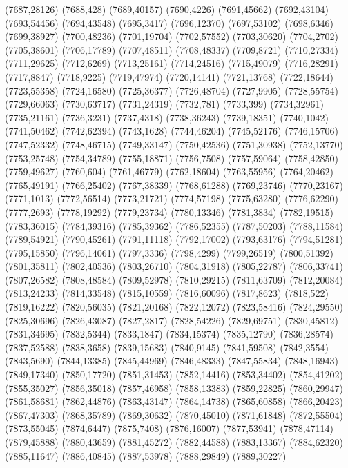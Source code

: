 (7687,28126)
(7688,428)
(7689,40157)
(7690,4226)
(7691,45662)
(7692,43104)
(7693,54456)
(7694,43548)
(7695,3417)
(7696,12370)
(7697,53102)
(7698,6346)
(7699,38927)
(7700,48236)
(7701,19704)
(7702,57552)
(7703,30620)
(7704,2702)
(7705,38601)
(7706,17789)
(7707,48511)
(7708,48337)
(7709,8721)
(7710,27334)
(7711,29625)
(7712,6269)
(7713,25161)
(7714,24516)
(7715,49079)
(7716,28291)
(7717,8847)
(7718,9225)
(7719,47974)
(7720,14141)
(7721,13768)
(7722,18644)
(7723,55358)
(7724,16580)
(7725,36377)
(7726,48704)
(7727,9905)
(7728,55754)
(7729,66063)
(7730,63717)
(7731,24319)
(7732,781)
(7733,399)
(7734,32961)
(7735,21161)
(7736,3231)
(7737,4318)
(7738,36243)
(7739,18351)
(7740,1042)
(7741,50462)
(7742,62394)
(7743,1628)
(7744,46204)
(7745,52176)
(7746,15706)
(7747,52332)
(7748,46715)
(7749,33147)
(7750,42536)
(7751,30938)
(7752,13770)
(7753,25748)
(7754,34789)
(7755,18871)
(7756,7508)
(7757,59064)
(7758,42850)
(7759,49627)
(7760,604)
(7761,46779)
(7762,18604)
(7763,55956)
(7764,20462)
(7765,49191)
(7766,25402)
(7767,38339)
(7768,61288)
(7769,23746)
(7770,23167)
(7771,1013)
(7772,56514)
(7773,21721)
(7774,57198)
(7775,63280)
(7776,62290)
(7777,2693)
(7778,19292)
(7779,23734)
(7780,13346)
(7781,3834)
(7782,19515)
(7783,36015)
(7784,39316)
(7785,39362)
(7786,52355)
(7787,50203)
(7788,11584)
(7789,54921)
(7790,45261)
(7791,11118)
(7792,17002)
(7793,63176)
(7794,51281)
(7795,15850)
(7796,14061)
(7797,3336)
(7798,4299)
(7799,26519)
(7800,51392)
(7801,35811)
(7802,40536)
(7803,26710)
(7804,31918)
(7805,22787)
(7806,33741)
(7807,26582)
(7808,48584)
(7809,52978)
(7810,29215)
(7811,63709)
(7812,20084)
(7813,24233)
(7814,33548)
(7815,10559)
(7816,60096)
(7817,8623)
(7818,522)
(7819,16222)
(7820,56035)
(7821,20168)
(7822,12072)
(7823,58416)
(7824,29550)
(7825,30696)
(7826,43087)
(7827,2817)
(7828,54226)
(7829,69751)
(7830,45812)
(7831,34695)
(7832,5344)
(7833,1847)
(7834,15374)
(7835,12790)
(7836,28574)
(7837,52588)
(7838,3658)
(7839,15683)
(7840,9145)
(7841,59508)
(7842,3554)
(7843,5690)
(7844,13385)
(7845,44969)
(7846,48333)
(7847,55834)
(7848,16943)
(7849,17340)
(7850,17720)
(7851,31453)
(7852,14416)
(7853,34402)
(7854,41202)
(7855,35027)
(7856,35018)
(7857,46958)
(7858,13383)
(7859,22825)
(7860,29947)
(7861,58681)
(7862,44876)
(7863,43147)
(7864,14738)
(7865,60858)
(7866,20423)
(7867,47303)
(7868,35789)
(7869,30632)
(7870,45010)
(7871,61848)
(7872,55504)
(7873,55045)
(7874,6447)
(7875,7408)
(7876,16007)
(7877,53941)
(7878,47114)
(7879,45888)
(7880,43659)
(7881,45272)
(7882,44588)
(7883,13367)
(7884,62320)
(7885,11647)
(7886,40845)
(7887,53978)
(7888,29849)
(7889,30227)
